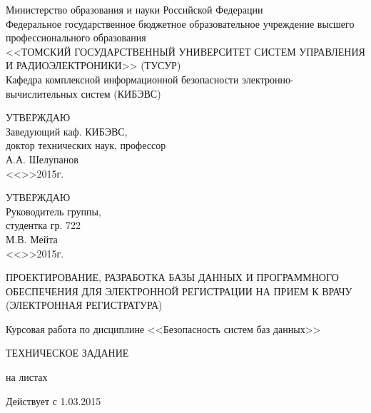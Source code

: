 
\begin{center}
 Министерство образования и науки Российской Федерации\\
 Федеральное государственное бюджетное образовательное учреждение высшего профессионального образования\\
 <<ТОМСКИЙ ГОСУДАРСТВЕННЫЙ УНИВЕРСИТЕТ СИСТЕМ УПРАВЛЕНИЯ И РАДИОЭЛЕКТРОНИКИ>> (ТУСУР)\\
 Кафедра комплексной информационной безопасности электронно-вычислительных систем (КИБЭВС)\\
\end{center}

\vfill


\begin{flushleft}
\begin{minipage}{0.45\textwidth}
 \begin{flushleft}
  УТВЕРЖДАЮ\\
  Заведующий каф. КИБЭВС, \\
  доктор технических наук, профессор \\
  \underline{\hspace{3cm}}А.А. Шелупанов \\
  <<\underline{\hspace{1cm}}>>\underline{\hspace{3cm}}2015г.\\
 \end{flushleft}
\end{minipage}
\hfill
\begin{minipage}{0.45\textwidth}
 \begin{flushleft}
  УТВЕРЖДАЮ\\
  Руководитель группы, \\
  студентка гр. 722 \\
  \underline{\hspace{3cm}}М.В. Мейта \\
  <<\underline{\hspace{1cm}}>>\underline{\hspace{3cm}}2015г.\\
 \end{flushleft}
\end{minipage}
\end{flushleft}

\vfill

\begin{center}
ПРОЕКТИРОВАНИЕ, РАЗРАБОТКА БАЗЫ ДАННЫХ И ПРОГРАММНОГО ОБЕСПЕЧЕНИЯ ДЛЯ ЭЛЕКТРОННОЙ РЕГИСТРАЦИИ НА ПРИЕМ К ВРАЧУ 
(ЭЛЕКТРОННАЯ РЕГИСТРАТУРА)

Курсовая работа по дисциплине <<Безопасность систем баз данных>>

ТЕХНИЧЕСКОЕ ЗАДАНИЕ

на \pageref{lastpage} листах

Действует с 1.03.2015
\end{center}

